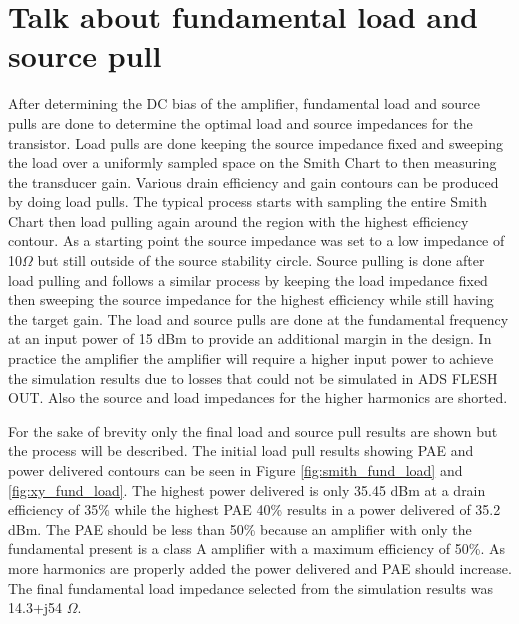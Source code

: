 
\section{Talk about fundamental load and source pull}

After determining the DC bias of the amplifier, fundamental load and source pulls are done to determine the optimal load and source impedances for the transistor. Load pulls are done keeping the source impedance fixed and sweeping the load over a uniformly sampled space on the Smith Chart to then measuring the transducer gain. Various drain efficiency and gain contours can be produced by doing load pulls. The typical process starts with sampling the entire Smith Chart then load pulling again around the region with the highest efficiency contour. As a starting point the source impedance was set to a low impedance of 10$\Omega$ but still outside of the source stability circle. Source pulling is done after load pulling and follows a similar process by keeping the load impedance fixed then sweeping the source impedance for the highest efficiency while still having the target gain. The load and source pulls are done at the fundamental frequency at an input power of 15 dBm to provide an additional margin in the design. In practice the amplifier the amplifier will require a higher input power to achieve the simulation results due to losses that could not be simulated in ADS FLESH OUT. Also the source and load impedances for the higher harmonics are shorted.

For the sake of brevity only the final load and source pull results are shown but the process will be described. The initial load pull results showing PAE and power delivered contours can be seen in Figure \ref{fig:smith_fund_load} and \ref{fig:xy_fund_load}. The highest power delivered is only 35.45 dBm at a drain efficiency of 35\% while the highest PAE 40\% results in a power delivered of 35.2 dBm. The PAE should be less than 50\% because an amplifier with only the fundamental present is a class A amplifier with a maximum efficiency of 50\%. As more harmonics are properly added the power delivered and PAE should increase. The final fundamental load impedance selected from the simulation results was 14.3+j54 $\Omega$.


